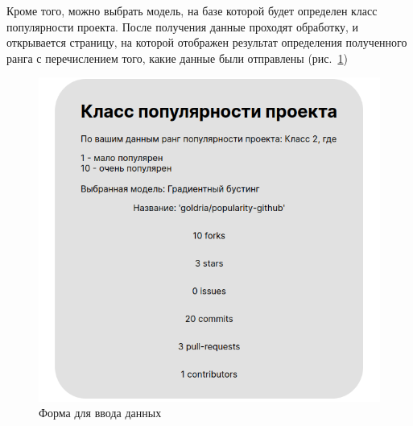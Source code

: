 Кроме того, можно выбрать модель, на базе которой будет определен класс популярности проекта. После получения данные проходят обработку, и открывается страницу, на которой отображен результат определения полученного ранга с перечислением того, какие данные были отправлены (рис.~\ref{ris:result-data})

\begin{center}
    \begin{figure}[H]
        \includegraphics[scale=0.5]{pic/result-data.png}
        \caption{Форма для ввода данных}
        \label{ris:result-data}
    \end{figure}
\end{center}
\vspace{1.5em}